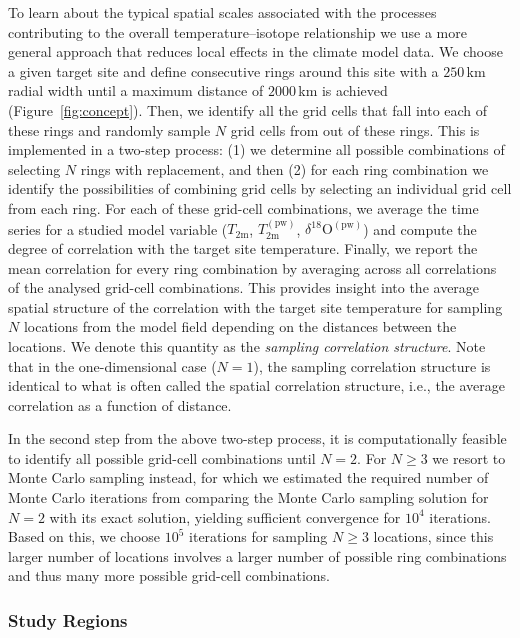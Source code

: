 \documentclass[draft]{agujournal2019}
\begin{document}
To learn about the typical spatial scales associated with the processes
contributing to the overall temperature--isotope relationship we use a more
general approach that reduces local effects in the climate model data. We choose
a given target site and define consecutive rings around this site with a
$250$\,km radial width until a maximum distance of $2000$\,km is achieved
(Figure~\ref{fig:concept}). Then, we identify all the grid cells that fall into
each of these rings and randomly sample $N$ grid cells from out of these
rings. This is implemented in a two-step process: (1) we determine all possible
combinations of selecting $N$ rings with replacement, and then (2) for each
ring combination we identify the possibilities of combining grid cells by
selecting an individual grid cell from each ring. For each of these grid-cell
combinations, we average the time series for a studied model variable
($T_{2\mathrm{m}}$, $T_{2\mathrm{m}}^{\mathrm{(pw)}}$,
$\delta^{18}\mathrm{O}^{\mathrm{(pw)}}$) and compute the degree of correlation
with the target site temperature. Finally, we report the mean correlation for
every ring combination by averaging across all correlations of the analysed
grid-cell combinations. This provides insight into the average spatial structure
of the correlation with the target site temperature for sampling $N$ locations
from the model field depending on the distances between the locations. We denote
this quantity as the \emph{sampling correlation structure}. Note that in the
one-dimensional case ($N=1$), the sampling correlation structure is identical to
what is often called the spatial correlation structure, i.e., the average
correlation as a function of distance.

In the second step from the above two-step process, it is computationally
feasible to identify all possible grid-cell combinations until $N=2$. For
$N\geq3$ we resort to Monte Carlo sampling instead, for which we estimated the
required number of Monte Carlo iterations from comparing the Monte Carlo
sampling solution for $N=2$ with its exact solution, yielding sufficient
convergence for $10^4$ iterations. Based on this, we choose $10^5$ iterations
for sampling $N\geq3$ locations, since this larger number of locations involves
a larger number of possible ring combinations and thus many more possible
grid-cell combinations.

\subsubsection{Study Regions}\label{methods:regions}
\end{document}
